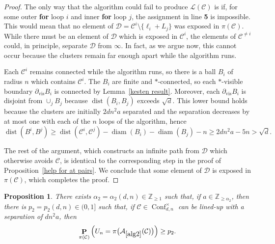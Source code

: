 \documentclass[11pt,reqno]{amsart}
\newtheorem{proposition}[lemma]{Proposition}
\theoremstyle{definition}
\numberwithin{equation}{section}
\newcommand{\Z}{\mathbb{Z}}
\newcommand{\1}{\mathbf{1}}
\DeclareMathOperator{\dist}{dist}
\DeclareMathOperator{\PP}{\mathbf{P}}
\DeclareMathOperator{\diam}{diam}
\newcommand{\bdyvis}{\partial_{\mathrm{vis}}}
\newcommand{\CC}{\mathcal{C}}
\DeclareMathOperator{\Conf}{\mathrm{Conf}}
\begin{document}
\begin{proof}
The only way that the algorithm could fail to produce $\mathcal{L} (\CC)$ is if, for some outer {\bf for} loop $i$ and inner {\bf for} loop $j$, the assignment in line {\bf 5} is impossible. This would mean that no element of $\mathcal{D} = \CC^i {\setminus} \{\ell_i + L_j\}$ was exposed in $\pi (\CC)$. While there must be an element of $\mathcal{D}$ which is exposed in $\CC^i$, the elements of $\CC^{\neq i}$ could, in principle, separate $\mathcal{D}$ from $\infty$. In fact, as we argue now, this cannot occur because the clusters remain far enough apart while the algorithm runs.

Each $\CC^i$ remains connected while the algorithm runs, so there is a ball $B_i$ of radius $n$ which contains $\CC^i$. The $B_i$ are finite and $\ast$-connected, so each $\ast$-visible boundary $\bdyvis B_i$ is connected by Lemma~\ref{kesten result}. Moreover, each $\bdyvis B_i$ is disjoint from $\cup_j B_j$ because $\dist (B_i, B_j)$ exceeds $\sqrt{d}$. This lower bound holds because the clusters are initially $2dn^2 a$ separated and the separation decreases by at most one with each of the $n$ loops of the algorithm, hence
\[
\dist (B^i, B^j) \geq \dist (\CC^i, \CC^j) - \diam (B_i) - \diam (B_j) - n \geq 2dn^2 a - 5n > \sqrt{d}.
\]

The rest of the argument, which constructs an infinite path from $\mathcal{D}$ which otherwise avoids $\CC$, is identical to the corresponding step in the proof of Proposition~\ref{help for at pairs}. We conclude that some element of $\mathcal{D}$ is exposed in $\pi (\CC)$, which completes the proof.
\end{proof}

\begin{proposition}\label{rearrange small}
There exists $\alpha_2 = \alpha_2 (d,n) \in \Z_{\geq 1}$ such that, if $a \in \Z_{\geq \alpha_2}$, then there is $p_2 = p_2 (d,n) \in (0,1]$ such that, if $\CC \in \Conf_{d,n}^\times$ can be lined-up with a separation of $dn^2 a$, then  
\begin{equation}\label{eq rearrange small}
\PP_{\pi (\CC)} \Big( U_n = \pi \big( \mathcal{A}_{\ref{alg2}} (\CC) \big) \Big) \geq p_2.
\end{equation}
\end{proposition}
\end{document}
